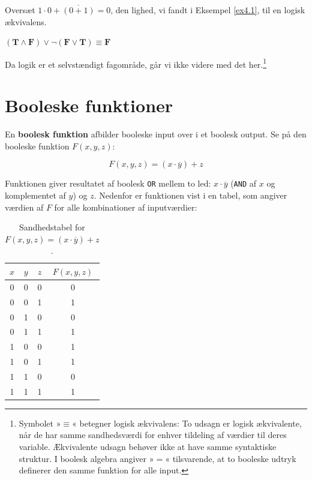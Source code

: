 \begin{example}
    Oversæt $1 \cdot 0+\overline{(0+1)}=0$, den lighed, vi fandt i Eksempel \ref{ex4.1}, til en logisk ækvivalens.

    \begin{solution}
        $(\mathbf{T} \wedge \mathbf{F}) \vee \neg(\mathbf{F} \vee \mathbf{T}) \equiv \mathbf{F}$
    \end{solution}
    
\end{example}

Da logik er et selvstændigt fagområde, går vi ikke videre med det her.\footnote{Symbolet »$\equiv$« betegner logisk ækvivalens: To udsagn er logisk ækvivalente, når de har samme sandhedsværdi for enhver tildeling af værdier til deres variable. Ækvivalente udsagn behøver ikke at have samme syntaktiske struktur. I boolesk algebra angiver »$=$« tilsvarende, at to booleske udtryk definerer den samme funktion for alle input.}

\section{Booleske funktioner}

En \textbf{boolesk funktion} afbilder booleske input over i et boolesk output. Se på den booleske funktion $F(x, y, z)$:

\[
F(x, y, z) = (x \cdot \overline{y}) + z
\]

Funktionen giver resultatet af boolesk \texttt{OR} mellem to led: $x \cdot \overline{y}$ (\texttt{AND} af $x$ og komplementet af $y$) og $z$. Nedenfor er funktionen vist i en tabel, som angiver værdien af $F$ for alle kombinationer af inputværdier:

\begin{table}[h!]
        \begin{center}
        \renewcommand{\arraystretch}{1.5} %
        \begin{tabular}{c|c|c|c}
        $x$ & $y$ & $z$ & $F(x, y, z)$ \\
        \hline
        0 & 0 & 0 & 0 \\
        \rowcolor{gray!20}
        0 & 0 & 1 & 1 \\
        0 & 1 & 0 & 0 \\
        \rowcolor{gray!20}
        0 & 1 & 1 & 1 \\
        1 & 0 & 0 & 1 \\
        \rowcolor{gray!20}
        1 & 0 & 1 & 1 \\
        1 & 1 & 0 & 0 \\
        \rowcolor{gray!20}
        1 & 1 & 1 & 1 \\
        \end{tabular}
        \end{center}
    \caption{Sandhedstabel for $F(x, y, z) = (x \cdot \overline{y}) + z$.}
    \label{tab:ttexam}
\end{table}

